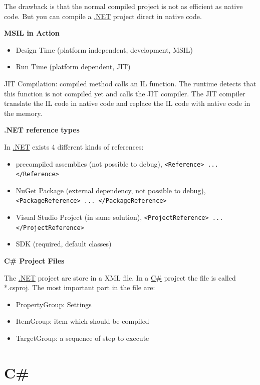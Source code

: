 \documentclass[11pt,twoside,landscape]{article}
\begin{document}
\begin{multicols}{3}
The drawback is that the normal compiled project is not as efficient as native code.
But you can compile a \href{../../../roam/20211003114703-net.org}{.NET} project direct in native code.

\textbf{MSIL in Action}

\begin{itemize}
\item Design Time (platform independent, development, MSIL)
\item Run Time (platform dependent, JIT)
\end{itemize}

JIT Compilation:
compiled method calls an IL function.
The runtime detects that this function is not compiled yet and calls the JIT compiler.
The JIT compiler translate the IL code in native code and replace the IL code with native code in the memory.

\textbf{.NET reference types}

In \href{../../../roam/20211003114703-net.org}{.NET} exists 4 different kinds of references:
\begin{itemize}
\item precompiled assemblies (not possible to debug), \texttt{<Reference> ... </Reference>}
\item \href{../../../roam/20211003140935-nuget_package.org}{NuGet Package} (external dependency, not possible to debug), \texttt{<PackageReference> ... </PackageReference>}
\item Visual Studio Project (in same solution), \texttt{<ProjectReference> ... </ProjectReference>}
\item SDK (required, default classes)
\end{itemize}


\textbf{C\# Project Files}

The \href{../../../roam/20211003114703-net.org}{.NET} project are store in a XML file.
In a \href{../../../roam/20211003114158-c.org}{C\#} project the file is called *.csproj.
The most important part in the file are:
\begin{itemize}
\item PropertyGroup: Settings
\item ItemGroup: item which should be compiled
\item TargetGroup: a sequence of step to execute
\end{itemize}

\section{C\#}
\label{sec:org7d2d6e0}


\end{multicols}
\end{document}
